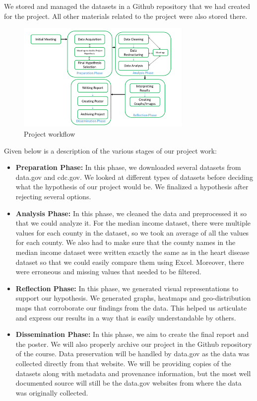 \documentclass[journal,12pt,onecolumn]{IEEEtran}
\begin{document}
We stored and managed the datasets in a Github repository that we had created for the project.
All other materials related to the project were also stored there.   

\begin{figure}[H]
\caption{Project workflow}
\centering
\includegraphics[width=0.75\textwidth]{figures/workflow.PNG}
\end{figure}
	
Given below is a description of the various stages of our project work:
\begin{itemize}
\item \textbf{Preparation Phase:}
In this phase, we downloaded several datasets from data.gov and cdc.gov. We looked at different types of datasets before deciding what the hypothesis of our project would be. We finalized a hypothesis after rejecting several options.
\item \textbf{Analysis Phase:}
In this phase, we cleaned the data and preprocessed it so that we could analyze it. For the median income dataset, there were multiple values for each county in the dataset, so we took an average of all the values for each county. We also had to make sure that the county names in the median income dataset were written exactly the same as in the heart disease dataset so that we could easily compare them using Excel. Moreover, there were erroneous and missing values that needed to be filtered.
\item \textbf{Reflection Phase:}
In this phase, we generated visual representations to support our hypothesis. We generated graphs, heatmaps and geo-distribution maps that corroborate our findings from the data. This helped us articulate and express our results in a way that is easily understandable by others.
\item \textbf{Dissemination Phase:}
In this phase, we aim to create the final report and the poster. We will also properly archive our project in the Github repository of the course. Data preservation will be handled by data.gov as the data was collected directly from that website. We will be providing copies of the datasets along with metadata and provenance information, but the most well documented source will still be the data.gov websites from where the data was originally collected.
\end{itemize}
\end{document}
